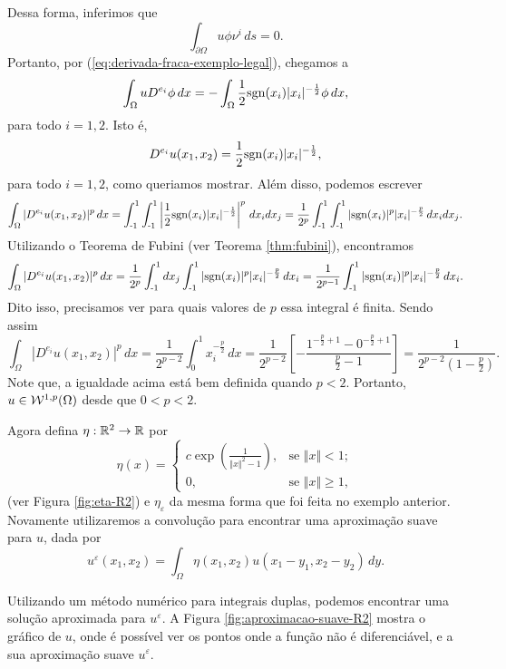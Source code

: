 \begin{ex}
    Dessa forma, inferimos que
    \[
        \int_{\partial\Omega} u \phi \nu^i \,ds = 0.
    \]
    Portanto, por (\ref{eq:derivada-fraca-exemplo-legal}), chegamos a
    \[
        \int_\Omega  u D^{e_i} \phi \,dx = - \int_\Omega \frac{1}{2}\mathrm{sgn}(x_i) |x_i|^{-\frac{1}{2}} \phi \,dx,
    \]
    para todo $i=1,2$.
    Isto é,
    \[
        D^{e_i} u(x_1,x_2) = \frac{1}{2}\mathrm{sgn}(x_i) |x_i|^{-\frac{1}{2}},
    \]
    para todo $i = 1,2$, como queriamos mostrar.
    Além disso, podemos escrever
    \[
        \int_\Omega |D^{e_i} u (x_1,x_2)|^p \, dx = \int_{\text{-}1}^1 \int_{\text{-}1}^1 \left| \frac{1}{2} \mathrm{sgn}(x_i) |x_i|^{-\frac{1}{2}} \right|^p \, dx_i dx_j = \frac{1}{2^p}\int_{\text{-}1}^1 \int_{\text{-}1}^1 |\mathrm{sgn}(x_i)|^p |x_i|^{-\frac{p}{2}} \,dx_i dx_j.
    \]
    Utilizando o Teorema de Fubini (ver Teorema \ref{thm:fubini}), encontramos
    {\small
    \[
        \int_\Omega |D^{e_i} u (x_1,x_2)|^p \, dx = \frac{1}{2^p}\int_{\text{-}1}^1 dx_j \int_{\text{-}1}^1 |\mathrm{sgn}(x_i)|^p |x_i|^{-\frac{p}{2}} \,dx_i = \frac{1}{2^{p-1}} \int_{\text{-}1}^1 |\mathrm{sgn}(x_i)|^p |x_i|^{-\frac{p}{2}} \,dx_i.
    \]}\!
    Dito isso, precisamos ver para quais valores de $p$ essa integral é finita. Sendo assim
    \[
        \int_\Omega |D^{e_i} u (x_1,x_2)|^p \, dx = \frac{1}{2^{p-2}}\int_0^1 x_i^{-\frac{p}{2}} \,dx = \frac{1}{2^{p-2}} \left[ -\frac{1^{-\frac{p}{2}+1} - 0^{-\frac{p}{2}+1}}{\tfrac{p}{2} - 1} \right] = \frac{1}{2^{p-2}\left( 1 - \frac{p}{2} \right)}.
    \]
    Note que, a igualdade acima está bem definida quando $p < 2$. Portanto, $u \in \mathcal{W}^{1,p}(\Omega)$ desde que $0 < p < 2$.

    Agora defina $\eta: \mathbb{R}^2 \to \mathbb{R}$ por
    \[
        \eta(x) = 
        \left\{ 
            \begin{array}{lr}
                c \exp\left(\frac{1}{\Vert x \Vert^2 - 1} \right), & \text{se } \Vert x \Vert < 1;\\
                0, & \text{se } \Vert x \Vert \geqslant 1,
            \end{array}
        \right.
    \]
    (ver Figura \ref{fig:eta-R2}) e $\eta_\varepsilon$ da mesma forma que foi feita no exemplo anterior. Novamente utilizaremos a convolução para encontrar uma aproximação suave para $u$, dada por
    \[
        u^{\varepsilon}(x_1,x_2) = \int_\Omega \eta(x_1,x_2) u(x_1 - y_1, x_2 - y_2) \,dy.
    \]

    Utilizando um método numérico para integrais duplas, podemos encontrar uma solução aproximada para $u^\varepsilon$.
    A Figura \ref{fig:aproximacao-suave-R2} mostra o gráfico de $u$, onde é possível ver os pontos onde a função não é diferenciável, e a sua aproximação suave $u^\varepsilon$.


\end{ex}
